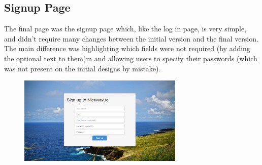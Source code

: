 \documentclass[a4paper,twoside,notitlepage,11pt]{article}
\begin{document}
\subsection{Signup Page}
The final page was the signup page which, like the log in page, is very simple, and didn't require many changes between the initial version and the final version. The main difference was highlighting which fields were not required (by adding the optional text to them)m and allowing users to specify their passwords (which was not present on the initial designs by mistake).
\begin{figure}[!ht]
	\begin{center}
		\includegraphics[width=0.7\textwidth]{images/final/signup.png}
	\end{center}
	\vspace{-6mm}
\end{figure}




 
 




 
  
 
  
\end{document}
